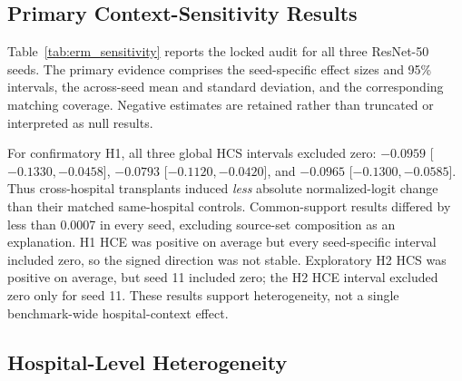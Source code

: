\documentclass[notspecified,article,submit,moreauthors]{Definitions/mdpi}
\begin{document}
\subsection{Primary Context-Sensitivity Results}

Table~\ref{tab:erm_sensitivity} reports the locked audit for all three
ResNet-50 seeds. The primary evidence comprises the seed-specific effect
sizes and 95\% intervals, the across-seed mean and standard deviation, and the
corresponding matching coverage. Negative estimates are retained rather than
truncated or interpreted as null results.

\begin{table}[H]
\caption{Global ResNet-50 paired context audit over prespecified seeds 11,
42, and 101. Estimates are pair-weighted; common-support estimates were
nearly identical. Mean$\pm$SD summarizes three seed point estimates; detailed
seed values and intervals appear in Table~\ref{tab:seed_results}.}
\label{tab:erm_sensitivity}
\centering
\scriptsize
\setlength{\tabcolsep}{3.0pt}
\end{table}

For confirmatory H1, all three global HCS intervals excluded zero:
$-0.0959$ [$-0.1330,-0.0458$], $-0.0793$
[$-0.1120,-0.0420$], and $-0.0965$ [$-0.1300,-0.0585$]. Thus cross-hospital
transplants induced \emph{less} absolute normalized-logit change than their
matched same-hospital controls. Common-support results differed by less than
0.0007 in every seed, excluding source-set composition as an explanation.
H1 HCE was positive on average but every seed-specific interval included
zero, so the signed direction was not stable. Exploratory H2 HCS was positive
on average, but seed 11 included zero; the H2 HCE interval excluded zero only
for seed 11. These results support heterogeneity, not a single benchmark-wide
hospital-context effect.

\subsection{Hospital-Level Heterogeneity}
\end{document}
